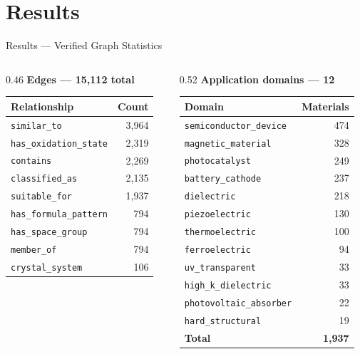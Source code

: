 \documentclass{beamer}
\begin{document}
\section{Results}
\begin{frame}{Results --- Verified Graph Statistics}
\begin{columns}[T]
\begin{column}{0.46\textwidth}
\centering \textbf{Edges --- 15,112 total}\\[0.15cm]
\scriptsize
\begin{tabular}{lr}
\toprule
\textbf{Relationship} & \textbf{Count} \\
\midrule
\texttt{similar\_to} & 3,964 \\
\texttt{has\_oxidation\_state} & 2,319 \\
\texttt{contains} & 2,269 \\
\texttt{classified\_as} & 2,135 \\
\texttt{suitable\_for} & 1,937 \\
\texttt{has\_formula\_pattern} & 794 \\
\texttt{has\_space\_group} & 794 \\
\texttt{member\_of} & 794 \\
\texttt{crystal\_system} & 106 \\
\bottomrule
\end{tabular}
\end{column}

\begin{column}{0.52\textwidth}
\centering \textbf{Application domains --- 12}\\[0.15cm]
\scriptsize
\begin{tabular}{lr}
\toprule
\textbf{Domain} & \textbf{Materials} \\
\midrule
\texttt{semiconductor\_device} & 474 \\
\texttt{magnetic\_material} & 328 \\
\texttt{photocatalyst} & 249 \\
\texttt{battery\_cathode} & 237 \\
\texttt{dielectric} & 218 \\
\texttt{piezoelectric} & 130 \\
\texttt{thermoelectric} & 100 \\
\texttt{ferroelectric} & 94 \\
\texttt{uv\_transparent} & 33 \\
\texttt{high\_k\_dielectric} & 33 \\
\texttt{photovoltaic\_absorber} & 22 \\
\texttt{hard\_structural} & 19 \\
\midrule
\textbf{Total} & \textbf{1,937} \\
\bottomrule
\end{tabular}
\end{column}
\end{columns}


\end{frame}
\end{document}
